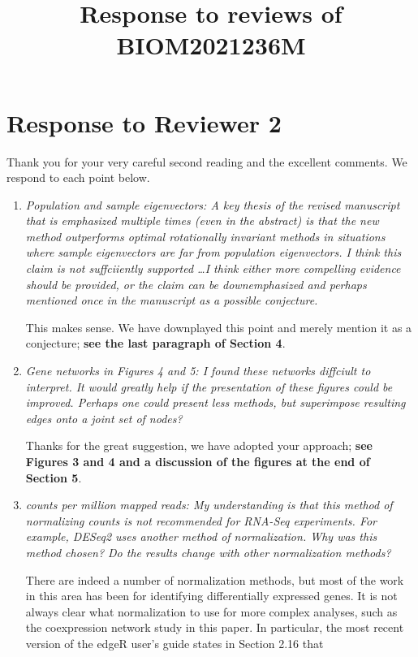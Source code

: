 \documentclass[12pt]{article}
\title{Response to reviews of BIOM2021236M}
\author{}
\date{}
\begin{document}
\maketitle

\section{Response to Reviewer 2}

Thank you for your very careful second reading and the excellent comments. We respond to each point below.

\begin{enumerate}
\item \emph{Population and sample eigenvectors: A key thesis of the revised manuscript that is emphasized multiple times (even in the abstract) is that the new method outperforms optimal rotationally invariant methods in situations where sample eigenvectors are far from population eigenvectors. I think this claim is not suffciiently supported \ldots I think either more compelling evidence should be provided, or the claim can be downemphasized and perhaps mentioned once in the manuscript as a possible conjecture.}

  This makes sense. We have downplayed this point and merely mention it as a conjecture; \textbf{see the last paragraph of Section 4}.

\item \emph{Gene networks in Figures 4 and 5: I found these networks diffciult to interpret. It would greatly help if the presentation of these figures could be improved. Perhaps one could present less methods, but superimpose resulting edges onto a joint set of nodes?}

  Thanks for the great suggestion, we have adopted your approach; \textbf{see Figures 3 and 4 and a discussion of the figures at the end of Section 5}.

\item \emph{counts per million mapped reads: My understanding is that this method of normalizing counts is not recommended for RNA-Seq experiments. For example, DESeq2 uses another method of normalization. Why was this method chosen? Do the results change with other normalization methods? }

  There are indeed a number of normalization methods, but most of the work in this area has been for identifying differentially expressed genes. It is not always clear what normalization to use for more complex analyses, such as the coexpression network study in this paper. In particular, the most recent version of the edgeR user's guide states in Section 2.16 that


\end{enumerate}
\end{document}
